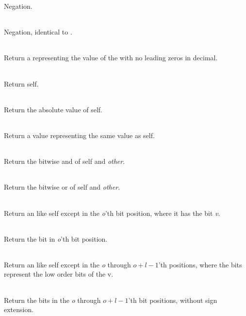 \begin{desc}
    Negation.
  \item[\kw{function} \opd{$-$} \returns{} \/\LB{}\tn{Integer}\/\RB{}]~\\
    Negation, identical to {\tt\mytilde}.
  \item[\kw{function} asString \returns{} \/\LB{}\tn{String}\/\RB{}]~\\
    Return a  representing the value of the  with no
    leading zeros in decimal.
  \item[\kw{function} hash \returns{} \/\LB{}\tn{Integer}\/\RB{}]~\\
    Return self.
  \item[\kw{function} abs \returns{} \/\LB{}\tn{Integer}\/\RB{}]~\\
    Return the absolute value of self.
  \item[\kw{function} asReal \returns{} \/\LB{}\tn{Real}\/\RB{}]~\\
    Return a  value representing the same value as self.
  \item[\kw{function} \opd{$\&$} \/\LB{}other \CO{} \tn{Integer}\/\RB{} \returns{} \/\LB{}\tn{Integer}\/\RB{}]~\\
    Return the bitwise and of self and {\it other}.
  \item[\kw{function} \opd{$|$} \/\LB{}other \CO{} \tn{Integer}\/\RB{} \returns{} \/\LB{}\tn{Integer}\/\RB{}]~\\
    Return the bitwise or of self and {\it other}.
  \item[\kw{function} setBit\/\LB{}o \CO{} \tn{Integer}, v \CO{} \tn{Boolean}\/\RB{} \returns{} \/\LB{}r \CO{} \tn{Integer}\/\RB{}]~\\
    Return an  like self except in the {\it o}'th bit position,
    where it has the bit {\it v}.
  \item[\kw{function} getBit\/\LB{}o \CO{} \tn{Integer}\/\RB{} \returns{} \/\LB{}r \CO{} \tn{Boolean}\/\RB{}]~\\
    Return the bit in {\it o}'th bit position.
  \item[\kw{function} setBits\/\LB{}o \CO{} \tn{Integer}, l \CO{} \tn{Integer}, v \CO{} \tn{Integer}\/\RB{} \returns{} \/\LB{}r \CO{} \tn{Integer}\/\RB{}]~\\
    Return an  like self except in the {\it o} through $o+l-1$'th positions, where
    the bits represent the low order bits of the  v.
  \item[\kw{function} getBits\/\LB{}o \CO{} \tn{Integer}, l \CO{} \tn{Integer}\/\RB{} \returns{} \/\LB{}r \CO{} \tn{Integer}\/\RB{}]~\\
    Return the bits in the {\it o} through $o+l-1$'th bit positions, without
    sign extension.
\end{desc}

